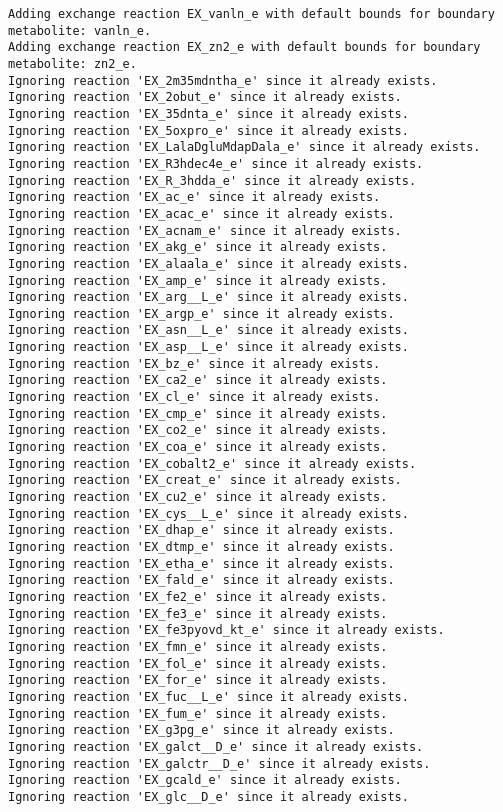 \documentclass[
  letterpaper,
  DIV=11,
  numbers=noendperiod]{scrartcl}
\begin{document}
\begin{verbatim}
Adding exchange reaction EX_vanln_e with default bounds for boundary metabolite: vanln_e.
Adding exchange reaction EX_zn2_e with default bounds for boundary metabolite: zn2_e.
Ignoring reaction 'EX_2m35mdntha_e' since it already exists.
Ignoring reaction 'EX_2obut_e' since it already exists.
Ignoring reaction 'EX_35dnta_e' since it already exists.
Ignoring reaction 'EX_5oxpro_e' since it already exists.
Ignoring reaction 'EX_LalaDgluMdapDala_e' since it already exists.
Ignoring reaction 'EX_R3hdec4e_e' since it already exists.
Ignoring reaction 'EX_R_3hdda_e' since it already exists.
Ignoring reaction 'EX_ac_e' since it already exists.
Ignoring reaction 'EX_acac_e' since it already exists.
Ignoring reaction 'EX_acnam_e' since it already exists.
Ignoring reaction 'EX_akg_e' since it already exists.
Ignoring reaction 'EX_alaala_e' since it already exists.
Ignoring reaction 'EX_amp_e' since it already exists.
Ignoring reaction 'EX_arg__L_e' since it already exists.
Ignoring reaction 'EX_argp_e' since it already exists.
Ignoring reaction 'EX_asn__L_e' since it already exists.
Ignoring reaction 'EX_asp__L_e' since it already exists.
Ignoring reaction 'EX_bz_e' since it already exists.
Ignoring reaction 'EX_ca2_e' since it already exists.
Ignoring reaction 'EX_cl_e' since it already exists.
Ignoring reaction 'EX_cmp_e' since it already exists.
Ignoring reaction 'EX_co2_e' since it already exists.
Ignoring reaction 'EX_coa_e' since it already exists.
Ignoring reaction 'EX_cobalt2_e' since it already exists.
Ignoring reaction 'EX_creat_e' since it already exists.
Ignoring reaction 'EX_cu2_e' since it already exists.
Ignoring reaction 'EX_cys__L_e' since it already exists.
Ignoring reaction 'EX_dhap_e' since it already exists.
Ignoring reaction 'EX_dtmp_e' since it already exists.
Ignoring reaction 'EX_etha_e' since it already exists.
Ignoring reaction 'EX_fald_e' since it already exists.
Ignoring reaction 'EX_fe2_e' since it already exists.
Ignoring reaction 'EX_fe3_e' since it already exists.
Ignoring reaction 'EX_fe3pyovd_kt_e' since it already exists.
Ignoring reaction 'EX_fmn_e' since it already exists.
Ignoring reaction 'EX_fol_e' since it already exists.
Ignoring reaction 'EX_for_e' since it already exists.
Ignoring reaction 'EX_fuc__L_e' since it already exists.
Ignoring reaction 'EX_fum_e' since it already exists.
Ignoring reaction 'EX_g3pg_e' since it already exists.
Ignoring reaction 'EX_galct__D_e' since it already exists.
Ignoring reaction 'EX_galctr__D_e' since it already exists.
Ignoring reaction 'EX_gcald_e' since it already exists.
Ignoring reaction 'EX_glc__D_e' since it already exists.

\end{verbatim}
\end{document}
